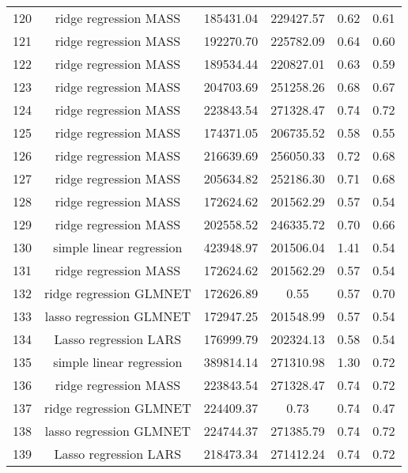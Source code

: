 \begin{tabular}{cccccc}
  120 & ridge regression MASS & 185431.04 & 229427.57 & 0.62 & 0.61 \\ 
  121 & ridge regression MASS & 192270.70 & 225782.09 & 0.64 & 0.60 \\ 
  122 & ridge regression MASS & 189534.44 & 220827.01 & 0.63 & 0.59 \\ 
  123 & ridge regression MASS & 204703.69 & 251258.26 & 0.68 & 0.67 \\ 
  124 & ridge regression MASS & 223843.54 & 271328.47 & 0.74 & 0.72 \\ 
  125 & ridge regression MASS & 174371.05 & 206735.52 & 0.58 & 0.55 \\ 
  126 & ridge regression MASS & 216639.69 & 256050.33 & 0.72 & 0.68 \\ 
  127 & ridge regression MASS & 205634.82 & 252186.30 & 0.71 & 0.68 \\ 
  128 & ridge regression MASS & 172624.62 & 201562.29 & 0.57 & 0.54 \\ 
  129 & ridge regression MASS & 202558.52 & 246335.72 & 0.70 & 0.66 \\ 
  130 & simple linear regression & 423948.97 & 201506.04 & 1.41 & 0.54 \\ 
  131 & ridge regression MASS & 172624.62 & 201562.29 & 0.57 & 0.54 \\ 
  132 & ridge regression GLMNET & 172626.89 & 0.55 & 0.57 & 0.70 \\ 
  133 & lasso regression GLMNET & 172947.25 & 201548.99 & 0.57 & 0.54 \\ 
  134 & Lasso regression LARS & 176999.79 & 202324.13 & 0.58 & 0.54 \\ 
  135 & simple linear regression & 389814.14 & 271310.98 & 1.30 & 0.72 \\ 
  136 & ridge regression MASS & 223843.54 & 271328.47 & 0.74 & 0.72 \\ 
  137 & ridge regression GLMNET & 224409.37 & 0.73 & 0.74 & 0.47 \\ 
  138 & lasso regression GLMNET & 224744.37 & 271385.79 & 0.74 & 0.72 \\ 
  139 & Lasso regression LARS & 218473.34 & 271412.24 & 0.74 & 0.72 \\ 
   \hline
\end{tabular}
